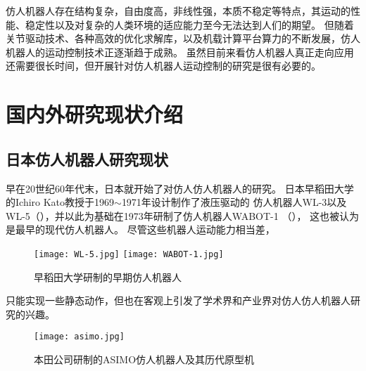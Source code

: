 仿人机器人存在结构复杂，自由度高，非线性强，本质不稳定等特点，其运动的性能、稳定性以及对复杂的人类环境的适应能力至今无法达到人们的期望。
但随着关节驱动技术、各种高效的优化求解库，以及机载计算平台算力的不断发展，仿人机器人的运动控制技术正逐渐趋于成熟。
虽然目前来看仿人机器人真正走向应用还需要很长时间，但开展针对仿人机器人运动控制的研究是很有必要的。
\section{国内外研究现状介绍}
\subsection{日本仿人机器人研究现状}
早在20世纪60年代末，日本就开始了对仿人仿人机器人的研究。
日本早稻田大学的Ichiro Kato教授于1969$\sim$1971年设计制作了液压驱动的
仿人机器人WL-3以及WL-5（），并以此为基础在1973年研制了仿人机器人WABOT-1 （），
这也被认为是最早的现代仿人机器人。
尽管这些机器人运动能力相当差，
\begin{figure}[htbp]
    \centering
        {%
            \texttt{[image: WL-5.jpg]}}
        {%
            \texttt{[image: WABOT-1.jpg]}}
    \caption{早稻田大学研制的早期仿人机器人\label{fig:japan_old}}
\end{figure}
只能实现一些静态动作，但也在客观上引发了学术界和产业界对仿人仿人机器人研究的兴趣。
\begin{figure}[htbp]
    \centering
    \texttt{[image: asimo.jpg]}
    \caption{\label{fig:asimo}本田公司研制的ASIMO仿人机器人及其历代原型机}
\end{figure}

